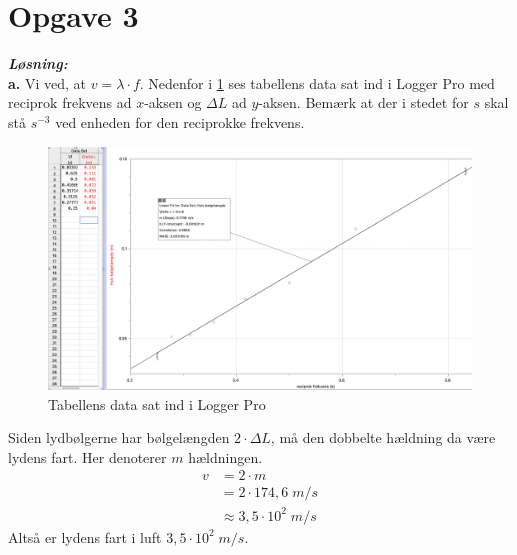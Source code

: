 \documentclass{report}
\newcommand{\sol}{\setlength{\parindent}{0cm}\textbf{\textit{Løsning:}}\setlength{\parindent}{1cm}}
\begin{document}
\section*{Opgave 3}
\sol \\
\textbf{a.}
Vi ved, at $v=\lambda \cdot f$.
Nedenfor i \cref{fig:interferens} ses tabellens data sat ind i Logger Pro med reciprok frekvens ad $x$-aksen og $\Delta L$ ad $y$-aksen. 
Bemærk at der i stedet for $s$ skal stå $s^{-3}$ ved enheden for den reciprokke frekvens.
\begin{figure}[H]
\begin{center}
  \includegraphics[width=\textwidth]{interferens.png}
\end{center}
\caption{Tabellens data sat ind i Logger Pro}
\label{fig:interferens}
\end{figure}
Siden lydbølgerne har bølgelængden $2 \cdot \Delta L$, må den dobbelte hældning da være lydens fart.
Her denoterer $m$ hældningen. 
\begin{equation*}
\begin{split}
  v&=2 \cdot m \\ 
  &= 2 \cdot 174,6 \;\unit{m/s} \\ 
  &\approx 3,5 \cdot 10^2 \;\unit{m/s} 
\end{split}
\end{equation*}
Altså er lydens fart i luft $3,5 \cdot 10^2 \;\unit{m/s} $.
\end{document}
